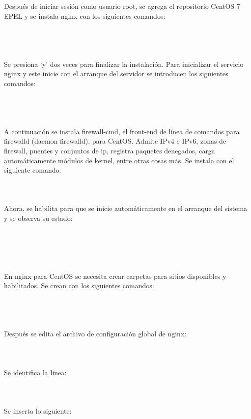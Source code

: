 Después de iniciar sesión como usuario root, se agrega el repositorio CentOS 7 EPEL y se instala nginx con los siguientes comandos:\\
\\
\\
\\
\\
Se presiona ‘y’ dos veces para finalizar la instalación. Para inicializar el servicio nginx y este inicie con el arranque del servidor se introducen los siguientes comandos:\\
\\
\\
\\
\\
A continuación se instala firewall-cmd, el front-end de línea de comandos para firewalld (\gls{daemon} firewalld), para CentOS. Admite IPv4 e IPv6, zonas de firewall, puentes y conjuntos de ip, registra paquetes denegados, carga automáticamente módulos de \gls{kernel}, entre otras cosas más. Se instala con el siguiente comando:\\
\\
\\
\\
Ahora, se habilita para que se inicie automáticamente en el arranque del sistema y se observa su estado:\\
\\
\\
\\
\\
\\
En nginx para CentOS se necesita crear carpetas para sitios disponibles y habilitados. Se crean con los siguientes comandos:\\
\\
\\
\\
\\
Después se edita el archivo de configuración global de nginx:\\
\\
\\
\\
Se identifica la linea:\\
\\
\\
\\
Se inserta lo siguiente:\\
\\
\\
\vspace{0.8cm}

